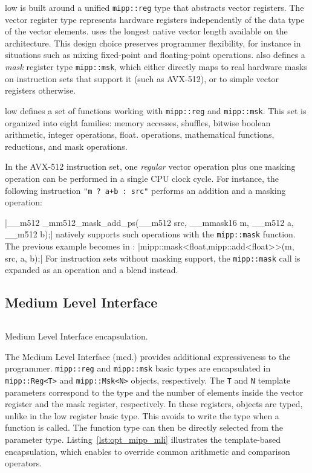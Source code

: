 \MIPP low is built around a unified \verb|mipp::reg| type that abstracts vector
registers. The vector register type represents hardware registers independently
of the data type of the vector elements. \MIPP uses the longest native vector
length available on the architecture. This design choice preserves programmer
flexibility, for instance in situations such as mixing fixed-point and
floating-point operations. \MIPP also defines a \emph{mask} register type
\verb|mipp::msk|, which either directly maps to real hardware masks on
instruction sets that support it (such as AVX-512), or to simple vector
registers otherwise.

\MIPP low defines a set of functions working with \verb|mipp::reg| and
\verb|mipp::msk|. This set is organized into eight families: memory accesses,
shuffles, bitwise boolean arithmetic, integer operations, float. operations,
mathematical functions, reductions, and mask operations.

In the AVX-512 instruction set, one \textit{regular} vector operation plus one
masking operation can be performed in a single CPU clock cycle. For instance,
the following instruction \verb|"m ? a+b : src"| performs an addition and a
masking operation:

|__m512 _mm512_mask_add_ps(__m512 src, __mmask16 m, __m512 a, __m512 b);|
{\noindent
\MIPP natively supports such operations with the \verb|mipp::mask| function. The
previous example becomes in \MIPP:
}
|mipp::mask<float,mipp::add<float>>(m, src, a, b);|
{\noindent
For instruction sets without masking support, the \verb|mipp::mask| call is
expanded as an operation and a blend instead.
}
\subsection{Medium Level Interface}

\begin{listing}[htp]
  \inputminted[frame=lines,linenos]{C++}{\curChapter/src/mipp/mli.cpp}
  \caption{Medium Level Interface encapsulation.}
  \label{lst:opt_mipp_mli}
\end{listing}

The \MIPP Medium Level Interface (\MIPP med.) provides additional expressiveness
to the programmer. \verb|mipp::reg| and \verb|mipp::msk| basic types are
encapsulated in \verb|mipp::Reg<T>| and \verb|mipp::Msk<N>| objects,
respectively. The \verb|T| and \verb|N| template parameters correspond to the
type and the number of elements inside the vector register and the mask
register, respectively. In these registers, objects are typed, unlike in the
\MIPP low register basic type. This avoids to write the type when a \MIPP
function is called. The function type can then be directly selected from the
parameter type. Listing~\ref{lst:opt_mipp_mli} illustrates the template-based
encapsulation, which enables \MIPP to override common arithmetic and comparison
operators.

